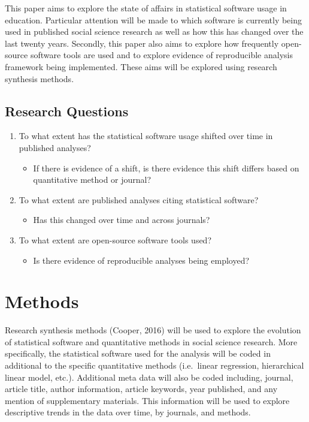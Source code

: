 \documentclass[english,,man]{apa6}
\providecommand{\tightlist}{%
  \setlength{\itemsep}{0pt}\setlength{\parskip}{0pt}}
\theoremstyle{definition}
\theoremstyle{definition}
\theoremstyle{definition}
\theoremstyle{remark}
\begin{document}
This paper aims to explore the state of affairs in statistical software
usage in education. Particular attention will be made to which software
is currently being used in published social science research as well as
how this has changed over the last twenty years. Secondly, this paper
also aims to explore how frequently open-source software tools are used
and to explore evidence of reproducible analysis framework being
implemented. These aims will be explored using research synthesis
methods.

\hypertarget{research-questions}{%
\subsection{Research Questions}\label{research-questions}}

\begin{enumerate}
\def\labelenumi{\arabic{enumi}.}
\tightlist
\item
  To what extent has the statistical software usage shifted over time in
  published analyses?

  \begin{itemize}
  \tightlist
  \item
    If there is evidence of a shift, is there evidence this shift
    differs based on quantitative method or journal?
  \end{itemize}
\item
  To what extent are published analyses citing statistical software?

  \begin{itemize}
  \tightlist
  \item
    Has this changed over time and across journals?
  \end{itemize}
\item
  To what extent are open-source software tools used?

  \begin{itemize}
  \tightlist
  \item
    Is there evidence of reproducible analyses being employed?
  \end{itemize}
\end{enumerate}

\hypertarget{methods}{%
\section{Methods}\label{methods}}

Research synthesis methods (Cooper, 2016) will be used to explore the
evolution of statistical software and quantitative methods in social
science research. More specifically, the statistical software used for
the analysis will be coded in additional to the specific quantitative
methods (i.e.~linear regression, hierarchical linear model, etc.).
Additional meta data will also be coded including, journal, article
title, author information, article keywords, year published, and any
mention of supplementary materials. This information will be used to
explore descriptive trends in the data over time, by journals, and
methods.
\end{document}
